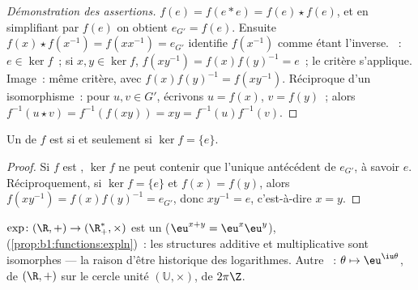 \begin{proof}[Démonstration des assertions]
$f(e) = f(e * e) = f(e)\star f(e)$, et en simplifiant par $f(e)$ on
obtient $e_{G'} = f(e)$. Ensuite $f(x)\star f(x^{-1}) = f(x x^{-1}) =
e_{G'}$ identifie $f(x^{-1})$ comme étant l'inverse. ~: $e \in
\ker f$~; si $x, y \in \ker f$, $f(xy^{-1}) = f(x)f(y)^{-1} = e$~; le
critère s'applique. Image~: même critère, avec $f(x)f(y)^{-1} =
f(xy^{-1})$. Réciproque d'un isomorphisme~: pour $u, v \in G'$,
écrivons $u = f(x)$, $v = f(y)$~; alors $f^{-1}(u \star v) =
f^{-1}(f(xy)) = xy = f^{-1}(u) f^{-1}(v)$.
\end{proof}

\begin{proposition}\label{prop:b1:structures:kernel}
Un  de  $f$ est  si et seulement si $\ker f =
\{e\}$.
\end{proposition}

\begin{proof}
Si $f$ est , $\ker f$ ne peut contenir que l'unique antécédent
de $e_{G'}$, à savoir $e$. Réciproquement, si $\ker f = \{e\}$ et
$f(x) = f(y)$, alors $f(xy^{-1}) = f(x) f(y)^{-1} = e_{G'}$, donc
$xy^{-1} = e$, c'est-à-dire $x = y$.
\end{proof}

\begin{example}\label{ex:b1:structures:expmorphism}
$\exp \colon (\R, +) \to (\R_+^*, \times)$ est un 
($\eu^{x+y} = \eu^x \eu^y$), 
(\cref{prop:b1:functions:expln})~: les structures additive et
multiplicative sont isomorphes --- la raison d'être historique des
logarithmes. Autre ~: $\theta \mapsto \eu^{\iu\theta}$, de
$(\R, +)$ sur le cercle unité $(\mathbb{U}, \times)$, de 
$2\pi\Z$.
\end{example}

